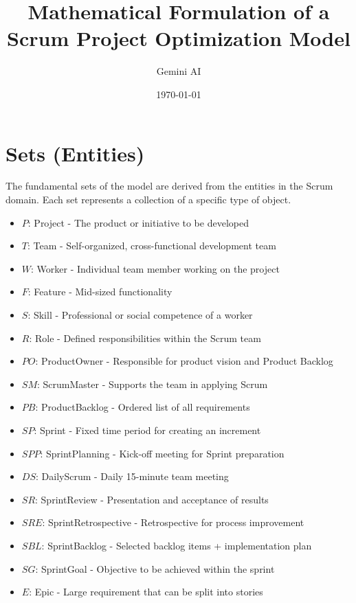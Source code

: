\documentclass[a4paper, 11pt]{article}
\title{Mathematical Formulation of a Scrum Project Optimization Model}
\author{Gemini AI}
\date{\today}
\begin{document}
\maketitle

\tableofcontents
\newpage

\section{Sets (Entities)}
\label{sec:sets}
The fundamental sets of the model are derived from the entities in the Scrum domain. Each set represents a collection of a specific type of object.

\begin{itemize}
    \item $P$: Project - The product or initiative to be developed
    \item $T$: Team - Self-organized, cross-functional development team
    \item $W$: Worker - Individual team member working on the project
    \item $F$: Feature - Mid-sized functionality
    \item $S$: Skill - Professional or social competence of a worker
    \item $R$: Role - Defined responsibilities within the Scrum team
    \item $PO$: ProductOwner - Responsible for product vision and Product Backlog
    \item $SM$: ScrumMaster - Supports the team in applying Scrum
    \item $PB$: ProductBacklog - Ordered list of all requirements
    \item $SP$: Sprint - Fixed time period for creating an increment
    \item $SPP$: SprintPlanning - Kick-off meeting for Sprint preparation
    \item $DS$: DailyScrum - Daily 15-minute team meeting
    \item $SR$: SprintReview - Presentation and acceptance of results
    \item $SRE$: SprintRetrospective - Retrospective for process improvement
    \item $SBL$: SprintBacklog - Selected backlog items + implementation plan
    \item $SG$: SprintGoal - Objective to be achieved within the sprint
    \item $E$: Epic - Large requirement that can be split into stories

\end{itemize}
\end{document}
